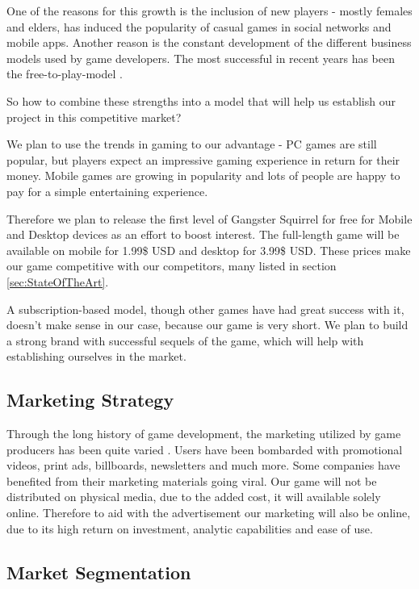 \documentclass[12p]{article}
\begin{document}
One of the reasons for this growth is the inclusion of new players - mostly females and elders, has induced the popularity of casual games in social networks and mobile apps. Another reason is the constant development of the different business models used by game developers. The most successful in recent years has been the free-to-play-model \cite{BusinessModelsAndStrategy}.

So how to combine these strengths into a model that will help us establish our project in this competitive market?

We plan to use the trends in gaming to our advantage - PC games are still popular, but players expect an impressive gaming experience in return for their money. Mobile games are growing in popularity and lots of people are happy to pay for a simple entertaining experience.

Therefore we plan to release the first level of Gangster Squirrel for free for Mobile and Desktop devices as an effort to boost interest. The full-length game will be available on mobile for 1.99\$ USD and desktop for 3.99\$ USD. These prices make our game competitive with our competitors, many listed in section \ref{sec:StateOfTheArt}.

A subscription-based model, though other games have had great success with it, doesn’t make sense in our case, because our game is very short. We plan to build a strong brand with successful sequels of the game, which will help with establishing ourselves in the market.

\subsection{Marketing Strategy}

Through the long history of game development, the marketing utilized by game producers has been quite varied \cite{MarketingStrategyExamples}. Users have been bombarded with promotional videos, print ads, billboards, newsletters and much more. Some companies have benefited from their marketing materials going viral.
Our game will not be distributed on physical media, due to the added cost, it will available solely online. Therefore to aid with the advertisement our marketing will also be online, due to its high return on investment, analytic capabilities and ease of use.


\subsection{Market Segmentation}
\end{document}
